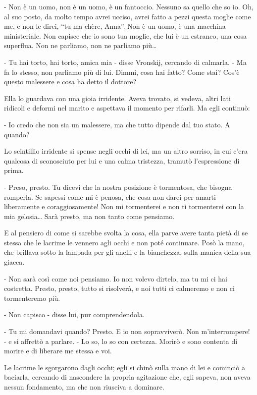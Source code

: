 - Non è un uomo, non è un uomo, è un fantoccio. Nessuno sa quello che so io. Oh, al suo posto, da molto tempo avrei ucciso, avrei fatto a pezzi questa moglie come me, e non le direi, ``tu ma chère, Anna''. Non è un uomo, è una macchina ministeriale. Non capisce che io sono tua moglie, che lui è un estraneo, una cosa superflua. Non ne parliamo, non ne parliamo più\ldots{} 

- Tu hai torto, hai torto, amica mia - disse Vronskij, cercando di calmarla. - Ma fa lo stesso, non parliamo più di lui. Dimmi, cosa hai fatto? Come stai? Cos'è questo malessere e cosa ha detto il dottore? 

Ella lo guardava con una gioia irridente. Aveva trovato, si vedeva, altri lati ridicoli e deformi nel marito e aspettava il momento per rifarli. Ma egli continuò: 

- Io credo che non sia un malessere, ma che tutto dipende dal tuo stato. A quando? 

Lo scintillio irridente si spense negli occhi di lei, ma un altro sorriso, in cui c'era qualcosa di sconosciuto per lui e una calma tristezza, tramutò l'espressione di prima. 

- Preso, presto. Tu dicevi che la nostra posizione è tormentosa, che bisogna romperla. Se sapessi come mi è penosa, che cosa non darei per amarti liberamente e coraggiosamente! Non mi tormenterei e non ti tormenterei con la mia gelosia\ldots{} Sarà presto, ma non tanto come pensiamo. 

E al pensiero di come si sarebbe svolta la cosa, ella parve avere tanta pietà di se stessa che le lacrime le vennero agli occhi e non poté continuare. Posò la mano, che brillava sotto la lampada per gli anelli e la bianchezza, sulla manica della sua giacca. 

- Non sarà così come noi pensiamo. Io non volevo dirtelo, ma tu mi ci hai costretta. Presto, presto, tutto si risolverà, e noi tutti ci calmeremo e non ci tormenteremo più. 

- Non capisco - disse lui, pur comprendendola. 

- Tu mi domandavi quando? Presto. E io non sopravviverò. Non m'interrompere! - e si affrettò a parlare. - Lo so, lo so con certezza. Morirò e sono contenta di morire e di liberare me stessa e voi. 

Le lacrime le sgorgarono dagli occhi; egli si chinò sulla mano di lei e cominciò a baciarla, cercando di nascondere la propria agitazione che, egli sapeva, non aveva nessun fondamento, ma che non riusciva a dominare. 


